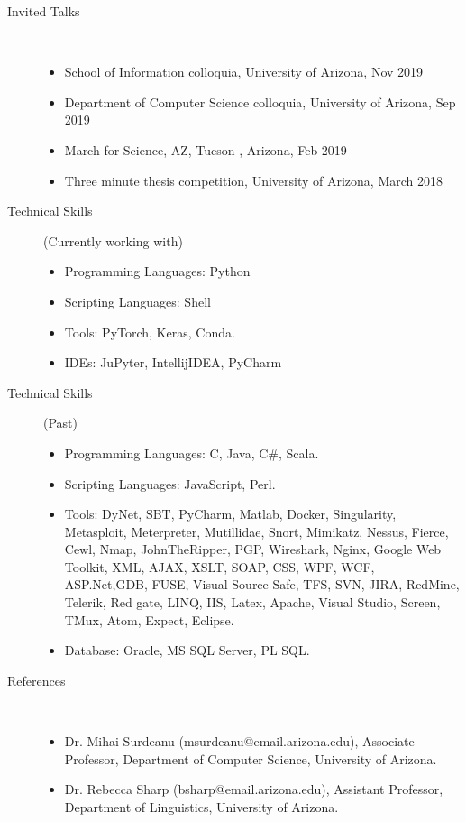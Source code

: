 \documentclass[10pt]{article}
\begin{document}
\begin{description}
\begin{itemize}
\end{itemize}




\newpage


\item [Invited Talks ]\
\begin{itemize}
\item School of Information colloquia, University of Arizona, Nov 2019
\item Department of Computer Science colloquia, University of Arizona, Sep 2019
\item March for Science, AZ, Tucson , Arizona, Feb 2019
\item Three minute thesis competition, University of Arizona, March 2018
\end{itemize}



\item [Technical Skills](Currently working with) \
\begin{itemize}
\itemsep0em
\item Programming Languages:  Python
\item Scripting Languages: Shell
\item Tools:  PyTorch, Keras, Conda.
\item IDEs: JuPyter,  IntellijIDEA, PyCharm
\end{itemize}


\item [Technical Skills] (Past) \
\begin{itemize}
\itemsep0em
\item Programming Languages:  C, Java, C\#, Scala.
\item Scripting Languages: JavaScript, Perl.
\item Tools: DyNet, SBT, PyCharm, Matlab, Docker, Singularity, Metasploit, Meterpreter, Mutillidae, Snort, Mimikatz, Nessus, Fierce, Cewl, Nmap, JohnTheRipper, PGP, Wireshark, Nginx, Google Web Toolkit, XML, AJAX, XSLT, SOAP, CSS, WPF, WCF, ASP.Net,GDB, FUSE, Visual Source Safe, TFS, SVN, JIRA, RedMine, Telerik, Red gate, LINQ, IIS, Latex, Apache, Visual Studio, Screen, TMux, Atom, Expect, Eclipse.
\item Database: Oracle, MS SQL Server, PL SQL.\\
\end{itemize}
\item [References]  \
\begin{itemize}
\itemsep0em
\item Dr. Mihai Surdeanu (msurdeanu@email.arizona.edu), Associate Professor, Department of Computer Science, University of Arizona.
\item Dr. Rebecca Sharp (bsharp@email.arizona.edu), Assistant Professor, Department of Linguistics, University of Arizona.
\end{itemize}

\end{description}
\end{document}

